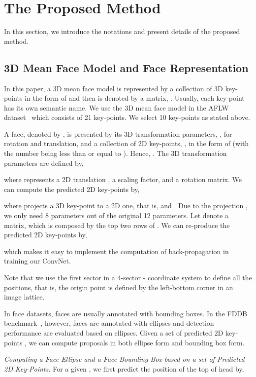\documentclass[runningheads]{llncs}
\begin{document}
\section{The Proposed Method}\label{sec:method}
In this section, we introduce the notations and present details of the proposed method.

\subsection{3D Mean Face Model and Face Representation}\label{sec:3Dparameter}
In this paper, a 3D mean face model is represented by a collection of  3D key-points in the form of  and then is denoted by a  matrix, . Usually, each key-point has its own semantic name. We use the 3D mean face model in the AFLW dataset~\cite{AFLW} which consists of 21 key-points. We select 10 key-points as stated above.

A face, denoted by , is presented by its 3D transformation parameters, , for rotation and translation, and a collection of 2D key-points, , in the form of  (with the number being less than or equal to ). Hence, . The 3D transformation parameters  are defined by,

where  represents a 2D translation ,  a scaling factor, and  a  rotation matrix. We can compute the predicted 2D key-points by,

where  projects a 3D key-point to a 2D one, that is,  and . Due to the projection , we only need 8 parameters out of the original 12 parameters. Let  denote a  matrix, which is composed by the top two rows of . We can re-produce the predicted 2D key-points by,
 
which makes it easy to implement the computation of back-propagation in training our ConvNet.

Note that we use the first sector in a 4-sector - coordinate system to define all the positions, that is, the origin point  is defined by the left-bottom corner in an image lattice.

In face datasets, faces are usually annotated with bounding boxes. In the FDDB benchmark~\cite{FDDB}, however, faces are annotated with ellipses and detection performance are evaluated based on ellipses.  Given a set of predicted 2D key-points , we can compute proposals in both ellipse form and bounding box form. 

\textit{Computing a Face Ellipse and a Face Bounding Box based on a set of Predicted 2D Key-Points.}
For a given ,  we first predict the position of the top of head by,
\end{document}
